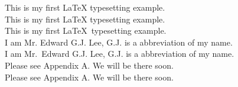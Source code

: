 \documentclass{report}
\begin{document}
This is my first {\LaTeX} typesetting example.\\
This is my first \LaTeX{} typesetting example.\\
This is my first \LaTeX\ typesetting example.\\
I am Mr. Edward G.J. Lee, G.J. is a abbreviation of my name.\\
I am Mr.\ Edward G.J. Lee, G.J. is a abbreviation of my name.\\
Please see Appendix A. We will be there soon.\\
Please see Appendix A\null. We will be there soon.
\end{document}
